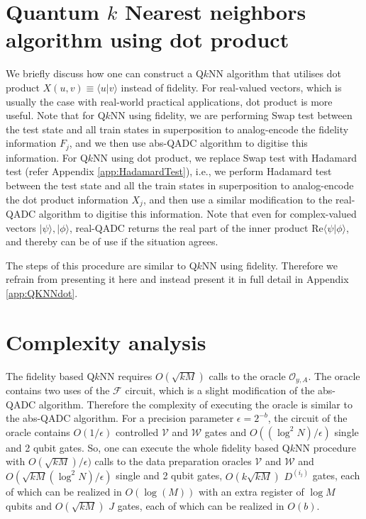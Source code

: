 \documentclass[a4paper,twocolumn,11pt,unpublished]{quantumarticle}
\newcommand{\rang}{\rangle}
\newcommand{\lang}{\langle}
\begin{document}
    
\section{Quantum $k$ Nearest neighbors algorithm using dot product}\label{sec:qknndot}    
    We briefly discuss how one can construct a  Q$k$NN algorithm that utilises dot product $X(u,v) \equiv \lang u|v\rang$ instead of fidelity. For real-valued vectors, which is usually the case with real-world practical applications, dot product is more useful. Note that for  Q$k$NN using fidelity, we are performing Swap test between the test state and all train states in superposition to analog-encode the fidelity information $F_j$, and we then use abs-QADC algorithm to digitise this information. For  Q$k$NN using dot product, we replace Swap test with Hadamard test (refer Appendix \ref{app:HadamardTest}), i.e., we perform Hadamard test between the test state and all the train states in superposition to analog-encode the dot product information $X_j$, and then use a similar modification to the real-QADC algorithm to digitise this information. Note that even for complex-valued vectors $|\psi\rang, |\phi\rang$, real-QADC returns the real part of the inner product $\text{Re} \lang \psi|\phi\rang$, and thereby can be of use if the situation agrees. 
    
    The steps of this procedure are similar to  Q$k$NN using fidelity. Therefore we refrain from presenting it here and instead present it in full detail in Appendix \ref{app:QKNNdot}.


\section{Complexity analysis}\label{sec:comp}
    The fidelity based  Q$k$NN requires $O(\sqrt{kM})$ calls to the oracle $\mathcal{O}_{y,A}$. The oracle contains two uses of the $\mathcal{F}$ circuit, which is a slight modification of the abs-QADC algorithm. Therefore the complexity of executing the oracle is similar to the abs-QADC algorithm. For a precision parameter $\epsilon = 2 ^ {-b}$, the circuit of the oracle contains $O(1/\epsilon)$ controlled $\mathcal{V}$ and $\mathcal{W}$ gates and $O((\log^2N)/\epsilon)$ single and 2 qubit gates. So, one can execute the whole fidelity based  Q$k$NN procedure with $O(\sqrt{kM})/\epsilon)$ calls to the data preparation oracles $\mathcal{V}$ and $\mathcal{W}$ and $O(\sqrt{kM}(\log^2N)/\epsilon)$ single and 2 qubit gates, $O(k\sqrt{kM})$ $D^{(i_l)}$ gates, each of which can be realized in $O(\log (M))$ with an extra register of $\log M$ qubits and $O(\sqrt{kM})$ $J$ gates, each of which can be realized in $O(b)$. 
    
\end{document}

